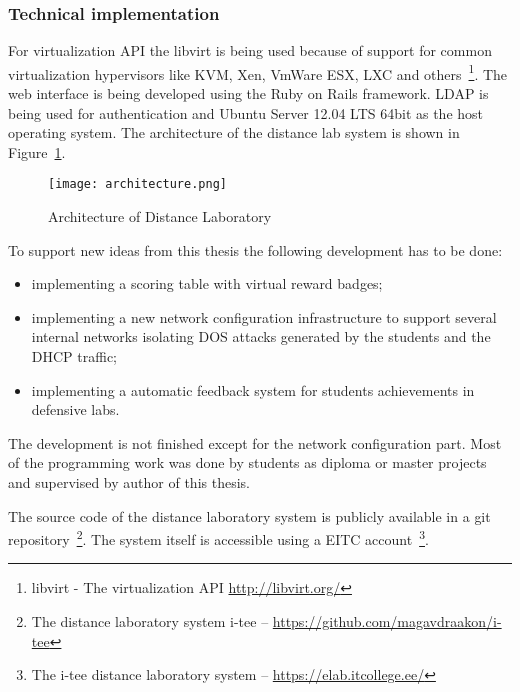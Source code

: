 \subsubsection{Technical implementation}
For virtualization \gls{API} the libvirt is being used because of support for common virtualization hypervisors like \gls{KVM}, Xen, VmWare ESX, LXC and others~\footnote{libvirt - The virtualization API \url{http://libvirt.org/}}. The web interface is being developed using the Ruby on Rails framework. \gls{LDAP} is being used for authentication and Ubuntu Server 12.04 LTS 64bit as the host operating system. The architecture of the distance lab system is shown in Figure~\ref{fig:Architecture of Distance Laboratory}.

\begin{figure}[ht]
\centering
\texttt{[image: architecture.png]}
\caption{Architecture of Distance Laboratory}
\label{fig:Architecture of Distance Laboratory}
\end{figure}

To support new ideas from this thesis the following development has to be done:
\begin{itemize}
\item implementing a scoring table with virtual reward badges;
\item implementing a new  network configuration infrastructure to support several internal networks isolating \gls{DOS} attacks generated by the students and the \gls{DHCP} traffic;
\item implementing a automatic feedback system for students achievements  in defensive labs.
\end{itemize}

The development is not finished except for the network configuration part. Most of the programming work was done by students as diploma or master projects and supervised by author of this thesis.

The source code of the distance laboratory system is publicly available in a \gls{git} repository~\footnote{The distance laboratory system i-tee -- \url{https://github.com/magavdraakon/i-tee}}.
The system itself is accessible using a \gls{EITC} account~\footnote{The i-tee distance laboratory system -- \url{https://elab.itcollege.ee/}}.
%

